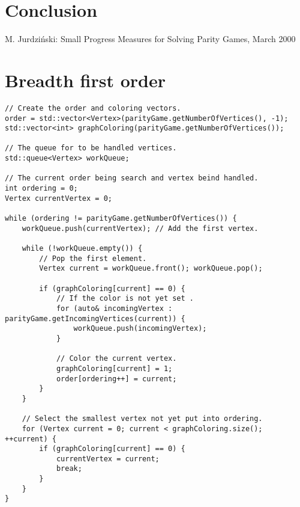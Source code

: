 \documentclass[10pt,a4paper]{article}
\begin{document}
\section{Conclusion}\label{conc}


\begin{thebibliography}{9}
 M. Jurdzi\'{n}ski: Small Progress Measures for Solving Parity Games, March 2000
\end{thebibliography}


\newpage
\appendix

\section{Breadth first order}\label{appendix:bfs}

\begin{verbatim}
// Create the order and coloring vectors.
order = std::vector<Vertex>(parityGame.getNumberOfVertices(), -1);
std::vector<int> graphColoring(parityGame.getNumberOfVertices());

// The queue for to be handled vertices.
std::queue<Vertex> workQueue;

// The current order being search and vertex beind handled.
int ordering = 0;
Vertex currentVertex = 0;

while (ordering != parityGame.getNumberOfVertices()) {
	workQueue.push(currentVertex); // Add the first vertex.

    while (!workQueue.empty()) {
    	// Pop the first element.
        Vertex current = workQueue.front(); workQueue.pop();

        if (graphColoring[current] == 0) {
        	// If the color is not yet set .
            for (auto& incomingVertex : parityGame.getIncomingVertices(current)) {
            	workQueue.push(incomingVertex);
            }

            // Color the current vertex.
            graphColoring[current] = 1;
            order[ordering++] = current;
        }
    }

    // Select the smallest vertex not yet put into ordering.
    for (Vertex current = 0; current < graphColoring.size(); ++current) {
    	if (graphColoring[current] == 0) {
        	currentVertex = current;
            break;
        }
    }
}
\end{verbatim}
\end{document}
